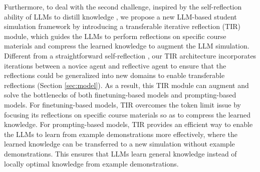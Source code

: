 Furthermore, to deal with the second challenge, inspired by the self-reflection ability of LLMs \cite{madaan2024self} to distill knowledge \cite{Xu2024ASO,gu2024minillm}, we propose a new LLM-based student simulation framework by introducing a transferable iterative reflection (TIR) module, which guides the LLMs to perform reflections on specific course materials and compress the learned knowledge to augment the LLM simulation. Different from a straightforward self-reflection \cite{madaan2024self}, our TIR architecture incorporates iterations between a novice agent and reflective agent to ensure that the reflections could be generalized into new domains to enable transferable reflections (Section \ref{sec:model}). As a result, this TIR module can augment and solve the bottlenecks of both finetuning-based models and prompting-based models. For finetuning-based models, TIR overcomes the token limit issue by focusing its reflections on specific course materials so as to compress the learned knowledge. For prompting-based models, TIR provides an efficient way to enable the LLMs to learn from example demonstrations more effectively, where the learned knowledge can be transferred to 
a new simulation without example demonstrations. This ensures that LLMs learn general knowledge instead of locally optimal knowledge from example demonstrations.  



